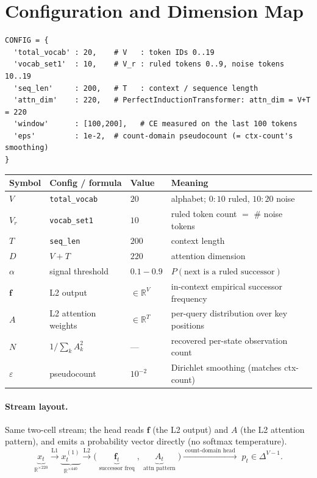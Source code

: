 \documentclass[11pt]{article}
\newcommand{\R}{\mathbb{R}}
\newcommand{\fvec}{\mathbf{f}}
\begin{document}
\section{Configuration and Dimension Map}
\begin{lstlisting}
CONFIG = {
  'total_vocab' : 20,    # V   : token IDs 0..19
  'vocab_set1'  : 10,    # V_r : ruled tokens 0..9, noise tokens 10..19
  'seq_len'     : 200,   # T   : context / sequence length
  'attn_dim'    : 220,   # PerfectInductionTransformer: attn_dim = V+T = 220
  'window'      : [100,200],   # CE measured on the last 100 tokens
  'eps'         : 1e-2,  # count-domain pseudocount (= ctx-count's smoothing)
}
\end{lstlisting}
\begin{center}\small
\begin{tabular}{@{}llll@{}}
\toprule
Symbol & Config / formula & Value & Meaning\\
\midrule
$V$        & \texttt{total\_vocab} & $20$  & alphabet; $0{:}10$ ruled, $10{:}20$ noise\\
$V_r$      & \texttt{vocab\_set1}  & $10$  & ruled token count $=$ \# noise tokens\\
$T$        & \texttt{seq\_len}     & $200$ & context length\\
$D$        & $V+T$                 & $220$ & attention dimension\\
$\alpha$   & signal threshold      & $0.1{-}0.9$ & $P(\text{next is a ruled successor})$\\
$\fvec$    & L2 output             & $\in\R^{V}$ & in-context empirical successor frequency\\
$A$        & L2 attention weights  & $\in\R^{T}$ & per-query distribution over key positions\\
$N$        & $1/\sum_k A_k^2$       & ---   & recovered per-state observation count\\
$\varepsilon$ & pseudocount        & $10^{-2}$ & Dirichlet smoothing (matches ctx-count)\\
\bottomrule
\end{tabular}
\end{center}

\paragraph{Stream layout.} Same two-cell stream; the head reads $\fvec$ (the L2 output) and $A$ (the
L2 attention pattern), and emits a probability vector directly (no softmax temperature).
\[
\underbrace{x_t}_{\R^{\times220}}\!\xrightarrow{\text{L1}}\!
\underbrace{x^{(1)}_t}_{\R^{\times440}}\!\xrightarrow{\text{L2}}\!
\Big(\;\underbrace{\fvec_t}_{\text{successor freq}}\;,\;\underbrace{A_t}_{\text{attn pattern}}\;\Big)
\xrightarrow{\;\text{count-domain head}\;}\; p_t\in\Delta^{V-1}.
\]
\end{document}
